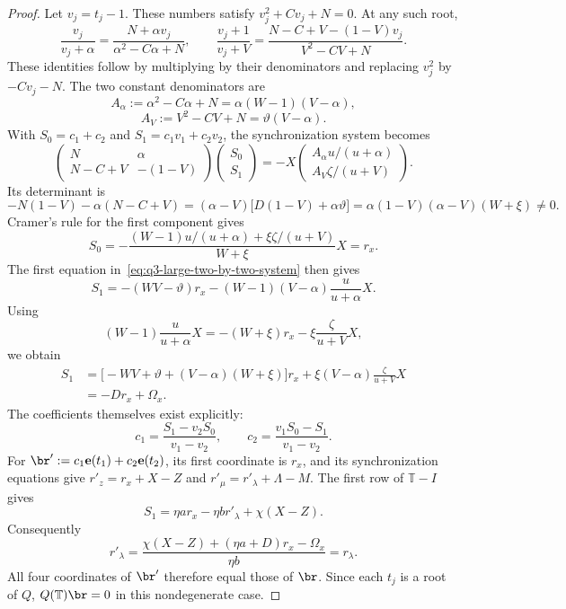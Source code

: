 \begin{proof}
Let \(v_j=t_j-1\). These numbers satisfy
\(v_j^2+Cv_j+N=0\). At any such root,
\[
\frac{v_j}{v_j+\alpha}
=\frac{N+\alpha v_j}{\alpha^2-C\alpha+N},
\qquad
\frac{v_j+1}{v_j+V}
=\frac{N-C+V-(1-V)v_j}{V^2-CV+N}.
\]
These identities follow by multiplying by their denominators and
replacing \(v_j^2\) by \(-Cv_j-N\).
The two constant denominators are
\[
A_\alpha:=\alpha^2-C\alpha+N
=\alpha(W-1)(V-\alpha),
\]
\[
A_V:=V^2-CV+N=\vartheta(V-\alpha).
\]
With \(S_0=c_1+c_2\) and \(S_1=c_1v_1+c_2v_2\),
the synchronization system becomes
\begin{equation}
\begin{pmatrix}
N&\alpha\\ N-C+V&-(1-V)
\end{pmatrix}
\begin{pmatrix}S_0\\ S_1\end{pmatrix}
=-X\begin{pmatrix}
A_\alpha u/(u+\alpha)\\ A_V\zeta/(u+V)
\end{pmatrix}.
\label{eq:q3-large-two-by-two-system}
\end{equation}
Its determinant is
\[
-N(1-V)-\alpha(N-C+V)
=(\alpha-V)\bigl[D(1-V)+\alpha\vartheta\bigr]
=\alpha(1-V)(\alpha-V)(W+\xi)\ne0.
\]
Cramer's rule for the first component gives
\[
S_0
=-\frac{(W-1)u/(u+\alpha)+\xi\zeta/(u+V)}{W+\xi}X
=r_x.
\]
The first equation in~\eqref{eq:q3-large-two-by-two-system}
then gives
\[
S_1=-(WV-\vartheta)r_x
       -(W-1)(V-\alpha)\frac{u}{u+\alpha}X.
\]
Using
\[
(W-1)\frac{u}{u+\alpha}X
=-(W+\xi)r_x-\xi\frac{\zeta}{u+V}X,
\]
we obtain
\[
\begin{aligned}
S_1
&=\bigl[-WV+\vartheta+(V-\alpha)(W+\xi)\bigr]r_x
  +\xi(V-\alpha)\frac{\zeta}{u+V}X\\
&=-Dr_x+\Omega_x.
\end{aligned}
\]
The coefficients themselves exist explicitly:
\[
c_1=\frac{S_1-v_2S_0}{v_1-v_2},
\qquad
c_2=\frac{v_1S_0-S_1}{v_1-v_2}.
\]
For \(\br':=c_1\mathbf{e}(t_1)+c_2\mathbf{e}(t_2)\),
its first coordinate is \(r_x\), and its synchronization equations
give \(r'_z=r_x+X-Z\) and
\(r'_\mu=r'_\lambda+\Lambda-M\).
The first row of \(\mathbb{T}-I\) gives
\[
S_1=\eta ar_x-\eta br'_\lambda+\chi(X-Z).
\]
Consequently
\[
r'_\lambda
=\frac{\chi(X-Z)+(\eta a+D)r_x-\Omega_x}{\eta b}
=r_\lambda.
\]
All four coordinates of \(\br'\) therefore equal those of \(\br\).
Since each \(t_j\) is a root of \(Q\),
\(Q(\mathbb{T})\br=0\) in this nondegenerate case.


\end{proof}
